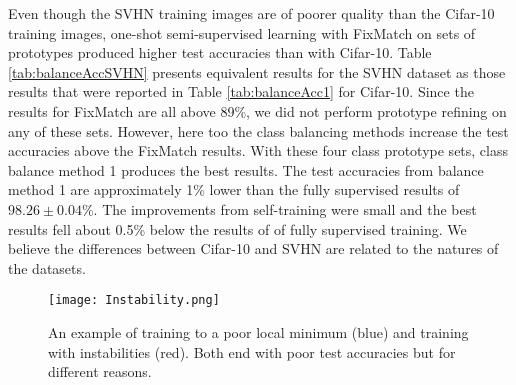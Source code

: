 \documentclass[final]{cvpr}
\newcommand{\OSSSL}{one-shot semi-supervised learning }
\begin{document}
Even though the SVHN training images are of poorer quality than the Cifar-10 training images, \OSSSL with FixMatch on sets of prototypes produced higher test accuracies than with Cifar-10.
Table \ref{tab:balanceAccSVHN} presents equivalent results for the SVHN dataset as those results that were reported in Table \ref{tab:balanceAcc1} for Cifar-10.
Since the results for FixMatch are all above 89\%, we did not perform prototype refining on any of these sets.
However, here too the class balancing methods increase the test accuracies above the FixMatch results.
With these four class prototype sets, class balance method 1 produces the best results.
The test accuracies from balance method 1 are approximately 1\% lower than the fully supervised results of $ 98.26 \pm 0.04 \%. $
The improvements from self-training were small and the best results fell about 0.5\% below the results of of fully supervised training.
We believe the differences between Cifar-10 and SVHN are related to the natures of the datasets.


\begin{figure}[t]
	\begin{center}
\texttt{[image: Instability.png]}
	\end{center}
	\caption{An example of training to a poor local minimum (blue) and training with instabilities (red). Both end with poor test accuracies but for different reasons. }
	\label{fig:instability}
\end{figure}
\end{document}

